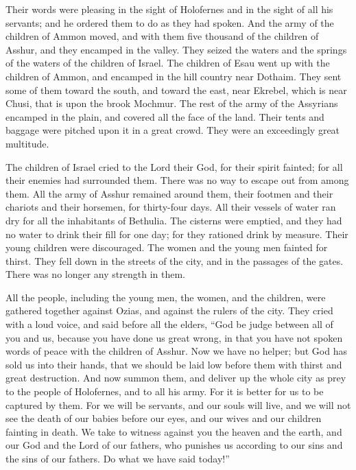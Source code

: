  Their words were pleasing in the sight of Holofernes and
in the sight of all his servants; and he ordered them to do as they had
spoken.  And the army of the children of Ammon moved, and
with them five thousand of the children of Asshur, and they encamped in
the valley. They seized the waters and the springs of the waters of the
children of Israel.  The children of Esau went up with
the children of Ammon, and encamped in the hill country near Dothaim.
They sent some of them toward the south, and toward the east, near
Ekrebel, which is near Chusi, that is upon the brook Mochmur. The rest
of the army of the Assyrians encamped in the plain, and covered all the
face of the land. Their tents and baggage were pitched upon it in a
great crowd. They were an exceedingly great multitude.

 The children of Israel cried to the Lord their God, for
their spirit fainted; for all their enemies had surrounded them. There
was no way to escape out from among them.  All the army
of Asshur remained around them, their footmen and their chariots and
their horsemen, for thirty-four days. All their vessels of water ran dry
for all the inhabitants of Bethulia.  The cisterns were
emptied, and they had no water to drink their fill for one day; for they
rationed drink by measure.  Their young children were
discouraged. The women and the young men fainted for thirst. They fell
down in the streets of the city, and in the passages of the gates. There
was no longer any strength in them.

 All the people, including the young men, the women, and
the children, were gathered together against Ozias, and against the
rulers of the city. They cried with a loud voice, and said before all
the elders,  ``God be judge between all of you and us,
because you have done us great wrong, in that you have not spoken words
of peace with the children of Asshur.  Now we have no
helper; but God has sold us into their hands, that we should be laid low
before them with thirst and great destruction.  And now
summon them, and deliver up the whole city as prey to the people of
Holofernes, and to all his army.  For it is better for us
to be captured by them. For we will be servants, and our souls will
live, and we will not see the death of our babies before our eyes, and
our wives and our children fainting in death.  We take to
witness against you the heaven and the earth, and our God and the Lord
of our fathers, who punishes us according to our sins and the sins of
our fathers. Do what we have said today!''

